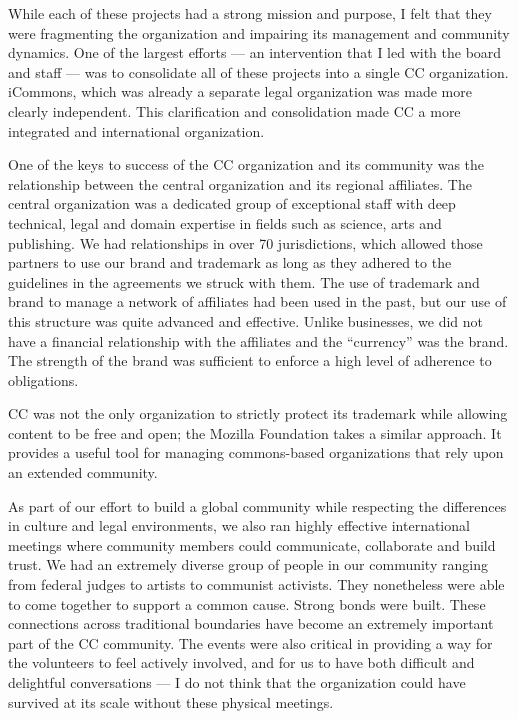 While each of these projects had a strong mission and purpose, I felt that they were fragmenting the organization and impairing its management and community dynamics. One of the largest efforts --- an intervention that I led with the board and staff --- was to consolidate all of these projects into a single \ac{CC} organization. iCommons, which was already a separate legal organization was made more clearly independent. This clarification and consolidation made \ac{CC} a more integrated and international organization.

One of the keys to success of the \ac{CC} organization and its community was the relationship between the central organization and its regional affiliates. The central organization was a dedicated group of exceptional staff with deep technical, legal and domain expertise in fields such as science, arts and publishing. We had relationships in over 70 jurisdictions, which allowed those partners to use our brand and trademark as long as they adhered to the guidelines in the agreements we struck with them. The use of trademark and brand to manage a network of affiliates had been used in the past, but our use of this structure was quite advanced and effective. Unlike businesses, we did not have a financial relationship with the affiliates and the ``currency'' was the brand. The strength of the brand was sufficient to enforce a high level of adherence to obligations.

 \ac{CC} was not the only organization to strictly protect its trademark while allowing content to be free and open; the Mozilla Foundation takes a similar approach. It provides a useful tool for managing commons-based organizations that rely upon an extended community.

As part of our effort to build a global community while respecting the differences in culture and legal environments, we also ran highly effective international meetings where community members could communicate, collaborate and build trust. We had an extremely diverse group of people in our community ranging from federal judges to artists to communist activists. They nonetheless were able to come together to support a common cause. Strong bonds were built. These connections across traditional boundaries have become an extremely important part of the \ac{CC} community. The events were also critical in providing a way for the volunteers to feel actively involved, and for us to have both difficult and delightful conversations --- I do not think that the organization could have survived at its scale without these physical meetings.

